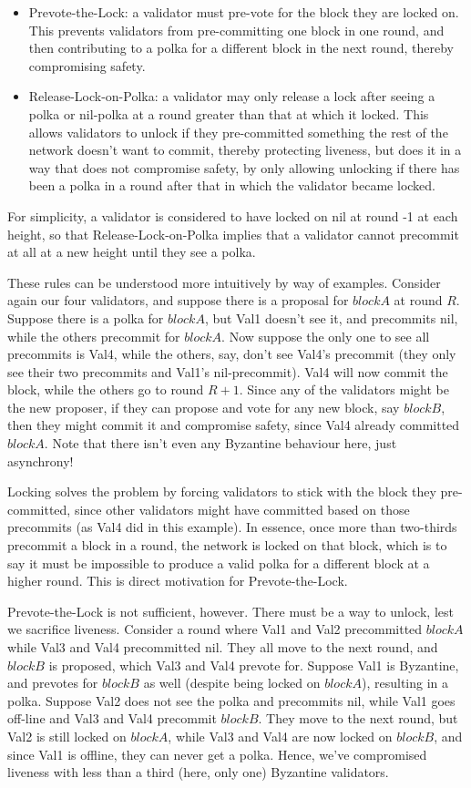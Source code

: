 \begin{itemize}
\item{Prevote-the-Lock: a validator must pre-vote for the block they are locked on. 
	This prevents validators from pre-committing one block in one round, 
	and then contributing to a polka for a different block in the next round, 
	thereby compromising safety.}
\item{Release-Lock-on-Polka: a validator may only release a lock after seeing a polka or nil-polka at a round greater than that at which it locked.
	This allows validators to unlock if they pre-committed something the rest of the network doesn't want to commit,
	thereby protecting liveness, but does it in a way that does not compromise safety,
	by only allowing unlocking if there has been a polka in a round after that in which the validator became locked.}
\end{itemize}


For simplicity, a validator is considered to have locked on nil at round -1 at each height, so that Release-Lock-on-Polka implies that a validator cannot precommit at all at a new height until they see a polka.

These rules can be understood more intuitively by way of examples. 
Consider again our four validators, and suppose there is a proposal for $blockA$ at round $R$. 
Suppose there is a polka for $blockA$, but Val1 doesn't see it, and precommits nil, while the others precommit for $blockA$.
Now suppose the only one to see all precommits is Val4, while the others, say, don't see Val4's precommit (they only see their two precommits and Val1's nil-precommit).
Val4 will now commit the block, while the others go to round $R+1$.
Since any of the validators might be the new proposer, if they can propose and vote for any new block, say $blockB$, then they might commit it and compromise safety, since Val4 already committed $blockA$.
Note that there isn't even any Byzantine behaviour here, just asynchrony!

Locking solves the problem by forcing validators to stick with the block they pre-committed, since other validators might have committed based on those precommits (as Val4 did in this example).
In essence, once more than two-thirds precommit a block in a round, the network is locked on that block,
which is to say it must be impossible to produce a valid polka for a different block at a higher round.
This is direct motivation for Prevote-the-Lock.

Prevote-the-Lock is not sufficient, however. There must be a way to unlock, lest we sacrifice liveness.
Consider a round where Val1 and Val2 precommitted $blockA$ while Val3 and Val4 precommitted nil.
They all move to the next round, and $blockB$ is proposed, which Val3 and Val4 prevote for.
Suppose Val1 is Byzantine, and prevotes for $blockB$ as well (despite being locked on $blockA$), resulting in a polka.
Suppose Val2 does not see the polka and precommits nil, while Val1 goes off-line and Val3 and Val4 precommit $blockB$. 
They move to the next round, but Val2 is still locked on $blockA$, while Val3 and Val4 are now locked on $blockB$, 
and since Val1 is offline, they can never get a polka. Hence, we've compromised liveness with less than a third (here, only one) Byzantine validators.

